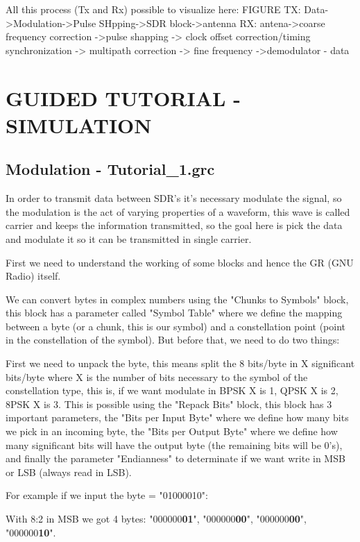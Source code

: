 \documentclass[a4paper, 10pt, conference]{ieeeconf}      %
\begin{document}
    All this process (Tx and Rx) possible to visualize here: FIGURE
    TX:
    Data->Modulation->Pulse SHpping->SDR block->antenna
    RX:
    antena->coarse frequency correction ->pulse shapping -> clock offset correction/timing synchronization -> multipath correction -> fine frequency ->demodulator - data
    
    
    
    

\section{GUIDED TUTORIAL - SIMULATION}
\subsection{Modulation - Tutorial\_1.grc}
    In order to transmit data between SDR's it's necessary modulate the signal, so the modulation is the act of varying properties of a waveform, this wave is called carrier and keeps the information transmitted, so the goal here is pick the data and modulate it so it can be transmitted in single carrier.
    
    First we need to understand the working of some blocks and hence the GR (GNU Radio) itself. 
    
    
    We can convert bytes in complex numbers using the "Chunks to Symbols" block, this block has a parameter called "Symbol Table" where we define the mapping between a byte (or a chunk, this is our symbol) and a constellation point (point in the constellation of the symbol). But before that, we need to do two things:
        
        First we need to unpack the byte, this means split the 8 bits/byte in X significant bits/byte where X is the number of bits necessary to the symbol of the constellation type, this is, if we want modulate in BPSK X is 1, QPSK X is 2, 8PSK X is 3.
        This is possible using the "Repack Bits" block, this block has 3 important parameters, the "Bits per Input Byte" where we define how many bits we pick in an incoming byte, the "Bits per Output Byte" where we define how many significant bits will have the output byte (the remaining bits will be 0's), and finally the parameter "Endianness" to determinate if we want write in MSB or LSB (always read in LSB). 
    
    For example if we input the byte = "01000010":
    
    With 8:2 in MSB we got 4 bytes: "000000\textbf{01}", "000000\textbf{00}", "000000\textbf{00}", "000000\textbf{10}".
    
\end{document}
